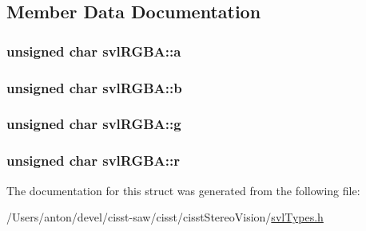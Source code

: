 \subsection{Member Data Documentation}
\hypertarget{structsvl_r_g_b_a_a013e40506e5c6adcec1dc614b2634c76}{}
\subsubsection[{a}]{\setlength{\rightskip}{0pt plus 5cm}unsigned char svl\+R\+G\+B\+A\+::a}\label{structsvl_r_g_b_a_a013e40506e5c6adcec1dc614b2634c76}
\hypertarget{structsvl_r_g_b_a_a7c139a15f87df0e403d602573029f063}{}
\subsubsection[{b}]{\setlength{\rightskip}{0pt plus 5cm}unsigned char svl\+R\+G\+B\+A\+::b}\label{structsvl_r_g_b_a_a7c139a15f87df0e403d602573029f063}
\hypertarget{structsvl_r_g_b_a_a367a65b4b35bc3b855a6d818c843d02f}{}
\subsubsection[{g}]{\setlength{\rightskip}{0pt plus 5cm}unsigned char svl\+R\+G\+B\+A\+::g}\label{structsvl_r_g_b_a_a367a65b4b35bc3b855a6d818c843d02f}
\hypertarget{structsvl_r_g_b_a_a851a1703a424dd9d4330eb669094e991}{}
\subsubsection[{r}]{\setlength{\rightskip}{0pt plus 5cm}unsigned char svl\+R\+G\+B\+A\+::r}\label{structsvl_r_g_b_a_a851a1703a424dd9d4330eb669094e991}


The documentation for this struct was generated from the following file\+:\begin{DoxyCompactItemize}
\item 
/\+Users/anton/devel/cisst-\/saw/cisst/cisst\+Stereo\+Vision/\hyperlink{svl_types_8h}{svl\+Types.\+h}\end{DoxyCompactItemize}
